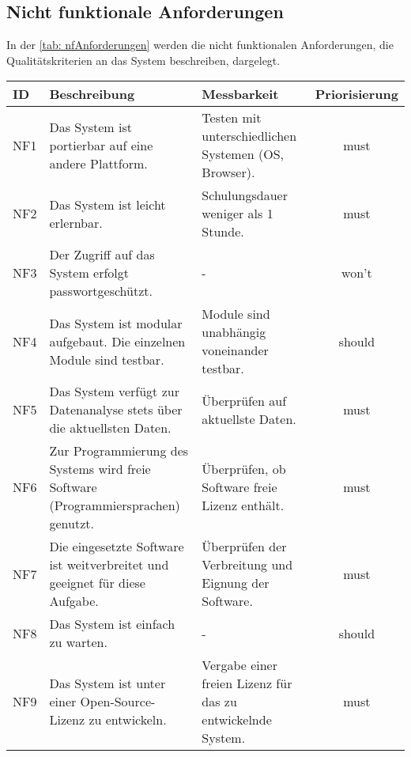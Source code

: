 \subsection{Nicht funktionale Anforderungen}
In der \autoref{tab: nfAnforderungen} werden die nicht funktionalen Anforderungen, die Qualitätskriterien an das System
beschreiben, dargelegt.
\begingroup
\setlength{\tabcolsep}{6pt} %
\begin{table}[H]
    \centering
    \begin{adjustbox}{max width=\textwidth}
    \begin{tabular}{lp{7.0cm}p{7.0cm}c}
       \toprule
       \textbf{ID}          & \textbf{Beschreibung} & \textbf{Messbarkeit} & \textbf{Priorisierung}\\
       \midrule
        NF1                               &Das System ist portierbar auf eine andere Plattform. & Testen mit unterschiedlichen Systemen (OS, Browser). & must\\
        NF2                               &Das System ist leicht erlernbar.& Schulungsdauer weniger als 1 Stunde.  & must\\
        NF3                               &Der Zugriff auf das System erfolgt passwortgeschützt. & -  & won't\\
        NF4                               &Das System ist modular aufgebaut. Die einzelnen Module sind testbar. & Module sind unabhängig voneinander testbar. & should\\
        NF5                               &Das System verfügt zur Datenanalyse stets über die aktuellsten Daten. & Überprüfen auf aktuellste Daten. & must\\
        NF6                               &Zur Programmierung des Systems wird freie Software (Programmiersprachen) genutzt. & Überprüfen, ob Software freie Lizenz enthält.  & must\\
        NF7                               &Die eingesetzte Software ist weitverbreitet und geeignet für diese Aufgabe. & Überprüfen der Verbreitung und Eignung der Software. & must\\
        NF8                               &Das System ist einfach zu warten. & - & should\\
        NF9                               &Das System ist unter einer Open-Source-Lizenz zu entwickeln. & Vergabe einer freien Lizenz für das zu entwickelnde System.  & must\\

\end{tabular}
\end{adjustbox}
\end{table}
